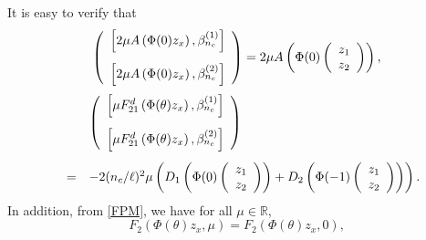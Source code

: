 \documentclass[11pt]{article}
\theoremstyle{definition}
\theoremstyle{remark}
\numberwithin{equation}{section}
\begin{document}
It is easy to verify that
\begin{equation}
\label{G211}
\left(\begin{array}{c}\left[2\mu A\left(\Phi(0) z_x\right),\beta_{n_c}^{(1)}\right]\vspace{0.3cm}\\
\left[2\mu A\left(\Phi(0) z_x\right),\beta_{n_c}^{(2)}\right]
\end{array}\right)=
2\mu  A\left( \Phi (0) \left(\begin{array}{c}z_1\\z_2\end{array}\right) \right),
\end{equation}
\begin{equation}
\label{G212}
\begin{array}{lll}
&&\left(\begin{array}{c}\left[\mu F^d_{21} \left(\Phi(\theta) z_x\right),\beta_{n_c}^{(1)}\right]\vspace{0.3cm}\\
\left[\mu F^d_{21} \left(\Phi(\theta) z_x\right),\beta_{n_c}^{(2)}\right]
\end{array}\right)\vspace{0.3cm}\\
&=&
-2(n_c/\ell)^2\mu \left(D_1\left( \Phi (0) \left(\begin{array}{c}z_1\\z_2\end{array}\right) \right)+D_2\left( \Phi (-1) \left(\begin{array}{c}z_1\\z_2\end{array}\right) \right)\right).
\end{array}
\end{equation}
In addition, from \eqref{FPM}, we have
for all $\mu\in \mathbb{R}$,
\begin{equation*}
\label{F2PHI}
F_2( \Phi(\theta) z_x,\mu)=F_2( \Phi(\theta) z_x, 0),
\end{equation*}
\end{document}
